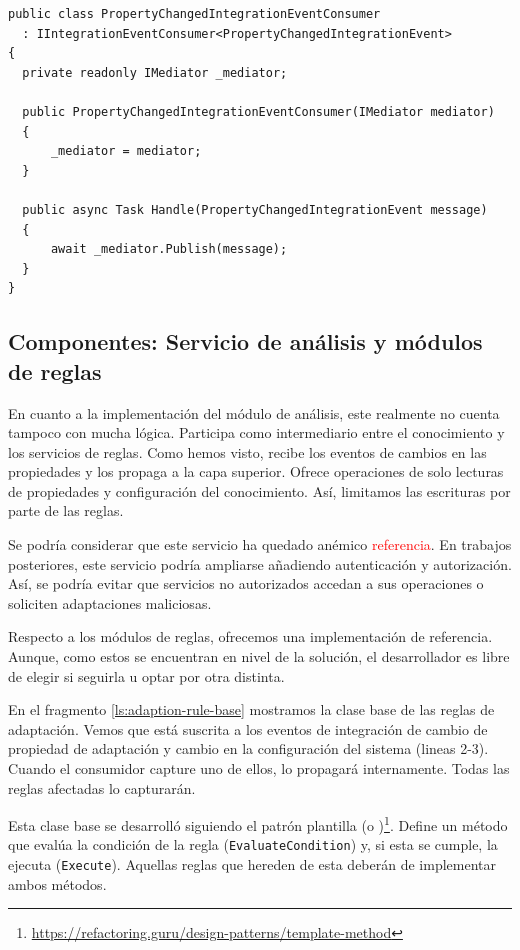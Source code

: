 \begin{lstlisting}[language={[Sharp]C},caption={El consumidor recibe el evento de integración del bus y lo propaga internamente. Todos los manejadores de este evento lo recibirán.},captionpos=b, label=ls:analysis-property-changed-consumer]
public class PropertyChangedIntegrationEventConsumer
  : IIntegrationEventConsumer<PropertyChangedIntegrationEvent>
{
  private readonly IMediator _mediator;

  public PropertyChangedIntegrationEventConsumer(IMediator mediator)
  {
      _mediator = mediator;
  }

  public async Task Handle(PropertyChangedIntegrationEvent message)
  {
      await _mediator.Publish(message);
  }
}
\end{lstlisting}

\subsection{Componentes: Servicio de análisis y módulos de reglas}

En cuanto a la implementación del módulo de análisis, este realmente no cuenta tampoco con mucha lógica. Participa como intermediario entre el conocimiento y los servicios de reglas. Como hemos visto, recibe los eventos de cambios en las propiedades y los propaga a la capa superior. Ofrece operaciones de solo lecturas de propiedades y configuración del conocimiento. Así, limitamos las escrituras por parte de las reglas.

Se podría considerar que este servicio ha quedado anémico \textcolor{red}{referencia}. En trabajos posteriores, este servicio podría ampliarse añadiendo autenticación y autorización. Así, se podría evitar que servicios no autorizados accedan a sus operaciones o soliciten adaptaciones maliciosas.

Respecto a los módulos de reglas, ofrecemos una implementación de referencia. Aunque, como estos se encuentran en nivel de la solución, el desarrollador es libre de elegir si seguirla u optar por otra distinta.

En el fragmento \ref{ls:adaption-rule-base} mostramos la clase base de las reglas de adaptación. Vemos que está suscrita a los eventos de integración de cambio de propiedad de adaptación y cambio en la configuración del sistema (lineas 2-3). Cuando el consumidor capture uno de ellos, lo propagará internamente. Todas las reglas afectadas lo capturarán.

Esta clase base se desarrolló siguiendo el patrón plantilla (o )\footnote{\url{https://refactoring.guru/design-patterns/template-method}}. Define un método que evalúa la condición de la regla (\texttt{EvaluateCondition}) y, si esta se cumple, la ejecuta (\texttt{Execute}). Aquellas reglas que hereden de esta deberán de implementar ambos métodos.

